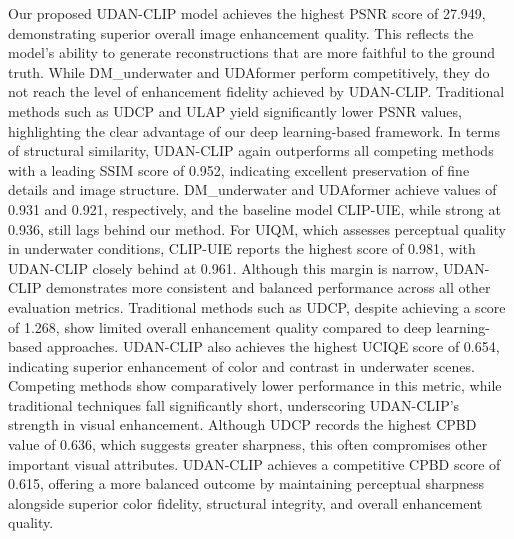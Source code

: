 \documentclass[3p,12pt,authoryear]{elsarticle}
\begin{document}
Our proposed UDAN-CLIP model achieves the highest PSNR score of 27.949, demonstrating superior overall image enhancement quality. This reflects the model’s ability to generate reconstructions that are more faithful to the ground truth. While DM\_underwater and UDAformer perform competitively, they do not reach the level of enhancement fidelity achieved by UDAN-CLIP. Traditional methods such as UDCP and ULAP yield significantly lower PSNR values, highlighting the clear advantage of our deep learning-based framework. In terms of structural similarity, UDAN-CLIP again outperforms all competing methods with a leading SSIM score of 0.952, indicating excellent preservation of fine details and image structure. DM\_underwater and UDAformer achieve values of 0.931 and 0.921, respectively, and the baseline model CLIP-UIE, while strong at 0.936, still lags behind our method. For UIQM, which assesses perceptual quality in underwater conditions, CLIP-UIE reports the highest score of 0.981, with UDAN-CLIP closely behind at 0.961. Although this margin is narrow, UDAN-CLIP demonstrates more consistent and balanced performance across all other evaluation metrics. Traditional methods such as UDCP, despite achieving a score of 1.268, show limited overall enhancement quality compared to deep learning-based approaches. UDAN-CLIP also achieves the highest UCIQE score of 0.654, indicating superior enhancement of color and contrast in underwater scenes. Competing methods show comparatively lower performance in this metric, while traditional techniques fall significantly short, underscoring UDAN-CLIP’s strength in visual enhancement. Although UDCP records the highest CPBD value of 0.636, which suggests greater sharpness, this often compromises other important visual attributes. UDAN-CLIP achieves a competitive CPBD score of 0.615, offering a more balanced outcome by maintaining perceptual sharpness alongside superior color fidelity, structural integrity, and overall enhancement quality.
\end{document}
